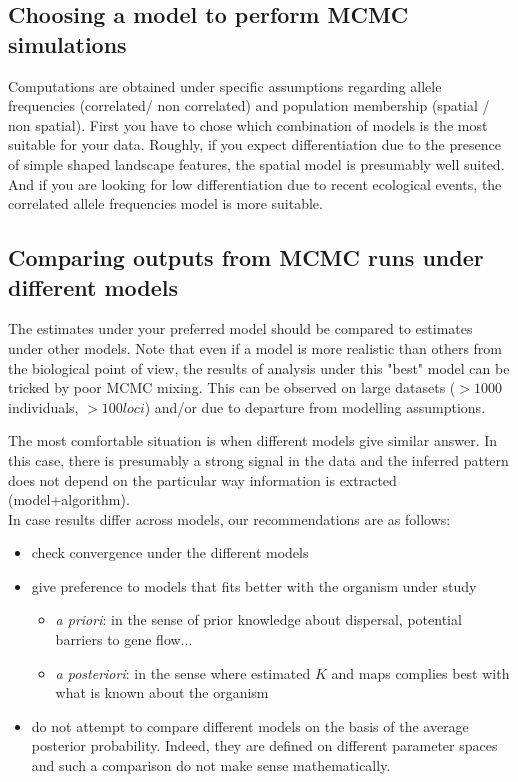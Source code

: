 \documentclass[a4paper,10pt]{article}
\begin{document}
\subsection{Choosing a model to perform MCMC simulations}

Computations are obtained under specific assumptions regarding allele frequencies (correlated/ non correlated) 
and population membership (spatial / non spatial). 
First you have to chose which combination of models is the most suitable for your data.
Roughly, if you expect differentiation due to the presence of simple shaped landscape features, the spatial model is presumably well suited. 
And if you are looking for low differentiation due to recent ecological events, the correlated allele frequencies model 
is more suitable. 

\subsection{Comparing outputs from MCMC runs under different models}

The estimates under your preferred model should be compared to estimates under other models. 
Note that even if a model is more realistic than others from the biological point of view, the results of analysis under this 
"best" model can be tricked by poor 
MCMC mixing. This can be    observed on large datasets ($> 1000$ individuals, $>100 loci$) and/or due to departure from modelling assumptions.


The most comfortable situation is when different models give similar answer. In this case, there is presumably a strong signal in the data 
and the inferred pattern does not depend on the particular way information is extracted (model+algorithm). \\
In case results differ across models, our recommendations are as follows:
\begin{itemize}
\item check convergence under the different models
\item give preference to models that fits better with the organism under study
  \begin{itemize}
  \item {\em a priori}: in the sense of prior knowledge about dispersal, potential barriers to gene flow...
  \item {\em a posteriori}: in the sense where estimated $K$ and maps complies best with what is known about the organism
  \end{itemize}
\item do not attempt to compare different models  on the basis of the average posterior probability. 
Indeed, they are defined on different parameter spaces and such a comparison do not make sense mathematically. 
\end{itemize}
\end{document}
